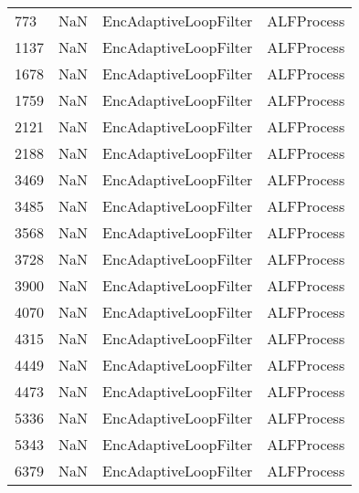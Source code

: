 \begin{tabular}{llll}
773  &                   NaN &      EncAdaptiveLoopFilter &                                ALFProcess \\
1137 &                   NaN &      EncAdaptiveLoopFilter &                                ALFProcess \\
1678 &                   NaN &      EncAdaptiveLoopFilter &                                ALFProcess \\
1759 &                   NaN &      EncAdaptiveLoopFilter &                                ALFProcess \\
2121 &                   NaN &      EncAdaptiveLoopFilter &                                ALFProcess \\
2188 &                   NaN &      EncAdaptiveLoopFilter &                                ALFProcess \\
3469 &                   NaN &      EncAdaptiveLoopFilter &                                ALFProcess \\
3485 &                   NaN &      EncAdaptiveLoopFilter &                                ALFProcess \\
3568 &                   NaN &      EncAdaptiveLoopFilter &                                ALFProcess \\
3728 &                   NaN &      EncAdaptiveLoopFilter &                                ALFProcess \\
3900 &                   NaN &      EncAdaptiveLoopFilter &                                ALFProcess \\
4070 &                   NaN &      EncAdaptiveLoopFilter &                                ALFProcess \\
4315 &                   NaN &      EncAdaptiveLoopFilter &                                ALFProcess \\
4449 &                   NaN &      EncAdaptiveLoopFilter &                                ALFProcess \\
4473 &                   NaN &      EncAdaptiveLoopFilter &                                ALFProcess \\
5336 &                   NaN &      EncAdaptiveLoopFilter &                                ALFProcess \\
5343 &                   NaN &      EncAdaptiveLoopFilter &                                ALFProcess \\
6379 &                   NaN &      EncAdaptiveLoopFilter &                                ALFProcess \\

\end{tabular}
